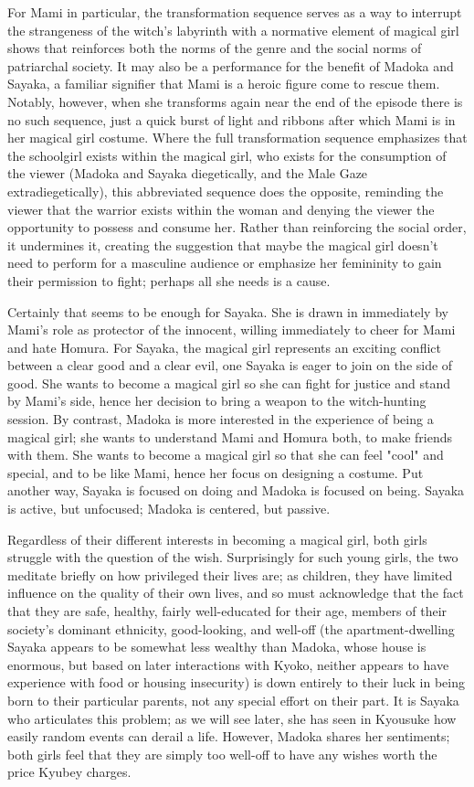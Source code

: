 For Mami in particular, the transformation sequence serves as a way to interrupt the strangeness of the witch's labyrinth with a normative element of magical girl shows that reinforces both the norms of the genre and the social norms of patriarchal society. It may also be a performance for the benefit of Madoka and Sayaka, a familiar signifier that Mami is a heroic figure come to rescue them. Notably, however, when she transforms again near the end of the episode there is no such sequence, just a quick burst of light and ribbons after which Mami is in her magical girl costume. Where the full transformation sequence emphasizes that the schoolgirl exists within the magical girl, who exists for the consumption of the viewer (Madoka and Sayaka diegetically, and the Male Gaze extradiegetically), this abbreviated sequence does the opposite, reminding the viewer that the warrior exists within the woman and denying the viewer the opportunity to possess and consume her. Rather than reinforcing the social order, it undermines it, creating the suggestion that maybe the magical girl doesn't need to perform for a masculine audience or emphasize her femininity to gain their permission to fight; perhaps all she needs is a cause.

Certainly that seems to be enough for Sayaka. She is drawn in immediately by Mami's role as protector of the innocent, willing immediately to cheer for Mami and hate Homura. For Sayaka, the magical girl represents an exciting conflict between a clear good and a clear evil, one Sayaka is eager to join on the side of good. She wants to become a magical girl so she can fight for justice and stand by Mami's side, hence her decision to bring a weapon to the witch-hunting session. By contrast, Madoka is more interested in the experience of being a magical girl; she wants to understand Mami and Homura both, to make friends with them. She wants to become a magical girl so that she can feel "cool" and special, and to be like Mami, hence her focus on designing a costume. Put another way, Sayaka is focused on doing and Madoka is focused on being. Sayaka is active, but unfocused; Madoka is centered, but passive.

Regardless of their different interests in becoming a magical girl, both girls struggle with the question of the wish. Surprisingly for such young girls, the two meditate briefly on how privileged their lives are; as children, they have limited influence on the quality of their own lives, and so must acknowledge that the fact that they are safe, healthy, fairly well-educated for their age, members of their society's dominant ethnicity, good-looking, and well-off (the apartment-dwelling Sayaka appears to be somewhat less wealthy than Madoka, whose house is enormous, but based on later interactions with Kyoko, neither appears to have experience with food or housing insecurity) is down entirely to their luck in being born to their particular parents, not any special effort on their part. It is Sayaka who articulates this problem; as we will see later, she has seen in Kyousuke how easily random events can derail a life. However, Madoka shares her sentiments; both girls feel that they are simply too well-off to have any wishes worth the price Kyubey charges.

